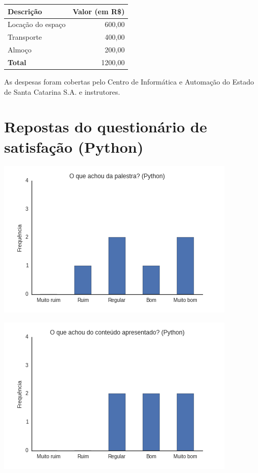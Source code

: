 \documentclass[12pt]{article}
\begin{document}
\begin{tabular}{p{}r}
  \textbf{Descrição} & \textbf{Valor} (em R\$) \\\hline
  Locação do espaço & 600,00 \\
  Transporte\footnotemark & 400,00 \\
  Almoço\footnotemark  & 200,00 \\\hline
  \textbf{Total} & 1200,00
\end{tabular}
\setcounter{footnote}{1}
\addtocounter{footnote}{1}

As despesas foram cobertas pelo Centro de Informática e Automação do Estado de Santa Catarina
S.A. e instrutores.

\newpage

\section*{Repostas do questionário de satisfação (Python)}

\begin{center}
    \includegraphics[height=0.25\textheight]{images/python1.png}
\end{center}

\begin{center}
    \includegraphics[height=0.25\textheight]{images/python2.png}
\end{center}
\end{document}
